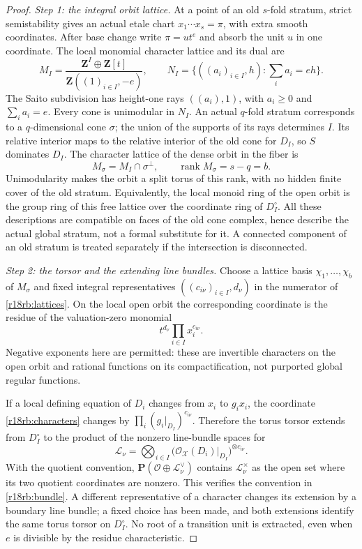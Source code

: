 \begin{proof}
\emph{Step 1: the integral orbit lattice.}
At a point of an old $s$-fold stratum, strict semistability gives an
actual etale chart $x_1\cdots x_s=\pi$, with extra smooth coordinates.
After base change write $\pi=u t^e$ and absorb the unit $u$ in one
coordinate.  The local monomial character lattice and its dual are
\[
 M_I=\frac{\mathbf Z^{I}\oplus\mathbf Z[t]}
               {\mathbf Z((1)_{i\in I},-e)},\qquad
 N_I=\{((a_i)_{i\in I},h):\sum_i a_i=eh\}.
 \tag{RB18.3}\label{r18rb:lattices}
\]
The Saito subdivision has height-one rays
$((a_i),1)$, with $a_i\ge0$ and $\sum_i a_i=e$.
Every cone is unimodular in $N_I$.
An actual $q$-fold stratum corresponds to a $q$-dimensional cone
$\sigma$; the union of the supports of its rays determines $I$.
Its relative interior maps to the relative interior of the old
cone for $D_I$, so $S$ dominates $D_I$.
The character lattice of the dense orbit in the fiber is
\[
                  M_\sigma=M_I\cap\sigma^\perp,
                       \qquad\operatorname{rank}M_\sigma=s-q=b.
 \tag{RB18.4}\label{r18rb:orbit-lattice}
\]
Unimodularity makes the orbit a split torus of this rank, with no
hidden finite cover of the old stratum.  Equivalently, the local
monoid ring of the open orbit is the group ring of this free
lattice over the coordinate ring of $D_I^\circ$.
All these descriptions are compatible on faces of the old
cone complex, hence describe the actual global stratum, not a
formal substitute for it.  A connected component of an old
stratum is treated separately if the intersection is disconnected.

\emph{Step 2: the torsor and the extending line bundles.}
Choose a lattice basis $\chi_1,\ldots,\chi_b$ of $M_\sigma$ and
fixed integral representatives
$((c_{i\nu})_{i\in I},d_\nu)$ in the numerator of
\eqref{r18rb:lattices}.  On the local open orbit the corresponding
coordinate is the residue of the valuation-zero monomial
\[
                           t^{d_\nu}\prod_{i\in I}x_i^{c_{i\nu}}.
 \tag{RB18.5}\label{r18rb:characters}
\]
Negative exponents here are permitted: these are invertible
characters on the open orbit and rational functions on its
compactification, not purported global regular functions.

If a local defining equation of $D_i$ changes from $x_i$ to
$g_i x_i$, the coordinate \eqref{r18rb:characters} changes by
$\prod_i(g_i|_{D_I})^{c_{i\nu}}$.  Therefore the torus torsor
extends from $D_I^\circ$ to the product of the nonzero line-bundle
spaces for
\[
                  \mathcal L_\nu=
                  \bigotimes_{i\in I}
                  \bigl(\mathcal O_{\mathcal X}(D_i)|_{D_I}\bigr)
                                      ^{\otimes c_{i\nu}}.
 \tag{RB18.6}\label{r18rb:line-bundles}
\]
With the quotient convention,
$\mathbf P(\mathcal O\oplus\mathcal L_\nu^\vee)$ contains
$\mathcal L_\nu^\times$ as the open set where its two quotient
coordinates are nonzero.  This verifies the convention in
\eqref{r18rb:bundle}.  A different representative of a character
changes its extension by a boundary line bundle; a fixed choice
has been made, and both extensions identify the same torus torsor
on $D_I^\circ$.  No root of a transition unit is extracted, even
when $e$ is divisible by the residue characteristic.


\end{proof}
